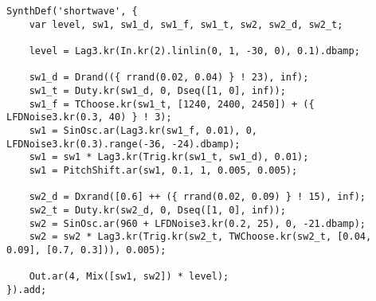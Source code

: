 \begin{lstlisting}[style=SuperCollider-IDE]
SynthDef('shortwave', {
	var level, sw1, sw1_d, sw1_f, sw1_t, sw2, sw2_d, sw2_t;

	level = Lag3.kr(In.kr(2).linlin(0, 1, -30, 0), 0.1).dbamp;

	sw1_d = Drand(({ rrand(0.02, 0.04) } ! 23), inf);
	sw1_t = Duty.kr(sw1_d, 0, Dseq([1, 0], inf));
	sw1_f = TChoose.kr(sw1_t, [1240, 2400, 2450]) + ({ LFDNoise3.kr(0.3, 40) } ! 3);
	sw1 = SinOsc.ar(Lag3.kr(sw1_f, 0.01), 0, LFDNoise3.kr(0.3).range(-36, -24).dbamp);
	sw1 = sw1 * Lag3.kr(Trig.kr(sw1_t, sw1_d), 0.01);
	sw1 = PitchShift.ar(sw1, 0.1, 1, 0.005, 0.005);

	sw2_d = Dxrand([0.6] ++ ({ rrand(0.02, 0.09) } ! 15), inf);
	sw2_t = Duty.kr(sw2_d, 0, Dseq([1, 0], inf));
	sw2 = SinOsc.ar(960 + LFDNoise3.kr(0.2, 25), 0, -21.dbamp);
	sw2 = sw2 * Lag3.kr(Trig.kr(sw2_t, TWChoose.kr(sw2_t, [0.04, 0.09], [0.7, 0.3])), 0.005);

	Out.ar(4, Mix([sw1, sw2]) * level);
}).add;
\end{lstlisting}
